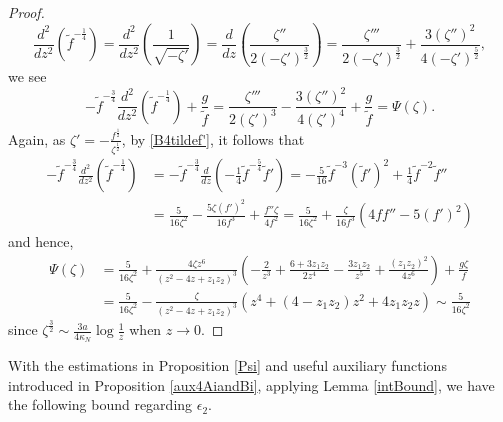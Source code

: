 \documentclass[11pt]{article}
\numberwithin{equation}{section}%
\numberwithin{theorem}{section}
\begin{document}
\begin{proof}
\begin{equation*}
    \frac{d^2}{dz^2}\left(\tilde{f}^{-\frac{1}{4}}\right)=\frac{d^2}{dz^2}\left(\frac{1}{\sqrt{-\zeta'}}\right)=\frac{d}{dz}\left(\frac{\zeta''}{2\left(-\zeta'\right)^\frac{3}{2}}\right)=\frac{\zeta'''}{2\left(-\zeta'\right)^\frac{3}{2}}+\frac{3(\zeta'')^2}{4\left(-\zeta'\right)^\frac{5}{2}},
\end{equation*}
we see
\begin{equation*}
    -\tilde{f}^{-\frac{3}{4}}\frac{d^2}{dz^2}\left(\tilde{f}^{-\frac{1}{4}}\right)+\frac{g}{\tilde{f}}=\frac{\zeta'''}{2(\zeta')^3}-\frac{3(\zeta'')^2}{4(\zeta')^4}+\frac{g}{\tilde{f}}=\Psi(\zeta).
\end{equation*}
Again, as $\zeta'=-\frac{f^\frac{1}{2}}{\zeta^\frac{1}{2}}$, by \eqref{B4tildef'}, it follows that
\begin{equation*}
    \begin{split}
        -\tilde{f}^{-\frac{3}{4}}\frac{d^2}{dz^2}\left(\tilde{f}^{-\frac{1}{4}}\right)&=-\tilde{f}^{-\frac{3}{4}}\frac{d}{dz}\left(-\frac{1}{4}\tilde{f}^{-\frac{5}{4}}\tilde{f}'\right)=-\frac{5}{16}\tilde{f}^{-3}\left(\tilde{f}'\right)^2+\frac{1}{4}\tilde{f}^{-2}\tilde{f}''\\
        &=\frac{5}{16\zeta^2}-\frac{5\zeta(f')^2}{16f^3}+\frac{f''\zeta}{4f^2}=\frac{5}{16\zeta^2}+\frac{\zeta}{16f^3}\left(4ff''-5(f')^2\right)
    \end{split}
\end{equation*}
and hence,
\begin{equation}\label{explicit4Psi}
    \begin{split}
        \Psi(\zeta)&=\frac{5}{16\zeta^2}+\frac{4\zeta z^6}{(z^2-4z+z_1z_2)^3}\left(-\frac{2}{z^3}+\frac{6+3z_1z_2}{2z^4}-\frac{3z_1z_2}{z^5}+\frac{(z_1z_2)^2}{4z^6}\right)+\frac{g\zeta}{f}\\
        &=\frac{5}{16\zeta^2}-\frac{\zeta}{(z^2-4z+z_1z_2)^3}\left(z^4+(4-z_1z_2)z^2+4z_1z_2z\right)\sim\frac{5}{16\zeta^2}
    \end{split}
\end{equation}
since $\zeta^\frac{3}{2}\sim\frac{3a}{4\kappa_N}\log\frac{1}{z}$ when $z\rightarrow0$.
\end{proof}

With the estimations in Proposition \ref{Psi} and useful auxiliary functions introduced in Proposition \ref{aux4AiandBi}, applying Lemma \ref{intBound}, we have the following bound regarding $\epsilon_2$.
\end{document}
